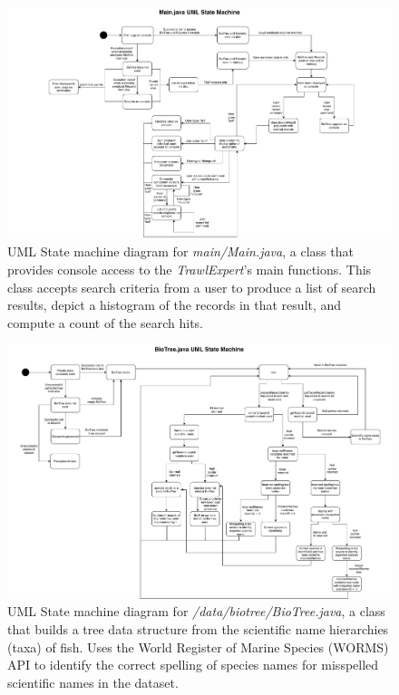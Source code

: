 \documentclass{article}
\begin{document}

\begin{figure}[H]
\includegraphics[width=18cm, trim={4.5cm 0 3cm 0}, clip]{MainDotJava.pdf}

\caption{UML State machine diagram for \textit{main/Main.java}, a class that provides console access to the \textit{TrawlExpert}'s main functions. This class accepts search criteria from a user to produce a list of search results, depict a histogram of the records in that result, and compute a count of the search hits.}
\label{fig:MainUML}
\end{figure}

\begin{figure}[H]
\centering
\includegraphics[width=18cm, trim={1.3cm 0 0 0}, clip]{BioTreeDotJava.pdf}

\caption{UML State machine diagram for \textit{/data/biotree/BioTree.java}, a class that builds a tree data structure from the scientific name hierarchies (taxa) of fish. Uses the World Register of Marine Species (WORMS) API to identify the correct spelling of species names for misspelled scientific names in the dataset. }
\label{fig:BioTreeUML}
\end{figure}
\end{document}

